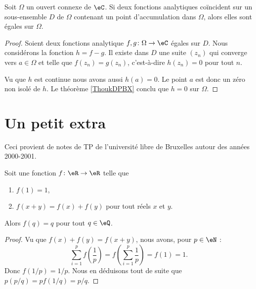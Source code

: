 \begin{theorem}\label{ThoAVBCewB}
	Soit \( \Omega\) un ouvert connexe de \( \eC\). Si deux fonctions analytiques coïncident sur un sous-ensemble \( D\) de \( \Omega\) contenant un point d'accumulation dans \( \Omega\), alors elles sont égales sur \( \Omega\).
\end{theorem}

\begin{proof}
	Soient deux fonctions analytique \( f,g\colon \Omega\to \eC\) égales sur \( D\). Nous considérons la fonction \( h=f-g\). Il existe dans \( D\) une suite \( (z_n)\) qui converge vers \( a\in \Omega\) et telle que \( f(z_n)=g(z_n)\), c'est-à-dire \( h(z_n)=0\) pour tout \( n\).

	Vu que \( h\) est continue nous avons aussi \( h(a)=0\). Le point \( a\) est donc un zéro non isolé de \( h\). Le théorème \ref{ThoukDPBX} conclu que \( h=0\) sur \( \Omega\).
\end{proof}

\section{Un petit extra}

Ceci provient de notes de TP de l'université libre de Bruxelles autour des années 2000-2001\cite{BIBooFYVSooNIiApF}.

\begin{lemma}        \label{LEMooXRMAooRADhOM}
	Soit une fonction \( f\colon \eR\to \eR\) telle que
	\begin{enumerate}

		\item		\label{ItemExtrai}
		      \( f(1)=1\),

		\item		\label{ItemExtraii}
		      \( f(x+y)=f(x)+f(y)\) pour tout réels \( x\) et \( y\).
	\end{enumerate}
	Alors \( f(q)=q\) pour tout \( q\in \eQ\).
\end{lemma}

\begin{proof}
	Vu que \( f(x)+f(y)=f(x+y)\), nous avons, pour \( p\in \eN\) :
	\begin{equation}
		\sum_{i=1}^pf(\frac{1}{ p })=f(\sum_{i=1}^p\frac{1}{ p })=f(1)=1.
	\end{equation}
	Donc \( f(1/p)=1/p\). Nous en déduisons tout de suite que \( p(p/q)=pf(1/q)=p/q\).
\end{proof}


